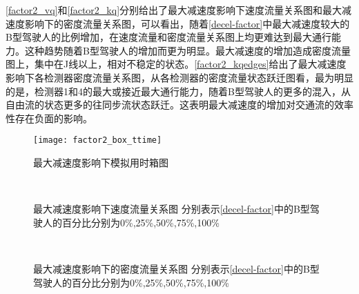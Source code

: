 \autoref{factor2_vq}和\autoref{factor2_kq}分别给出了最大减速度影响下速度流量关系图和最大减速度影响下的密度流量关系图，可以看出，随着\autoref{decel-factor}中最大减速度较大的B型驾驶人的比例增加，在速度流量和密度流量关系图上均更难达到最大通行能力。这种趋势随着B型驾驶人的增加而更为明显。最大减速度的增加造成密度流量图上，集中在J线以上，相对不稳定的状态。\autoref{factor2_kqedges}给出了最大减速度影响下各检测器密度流量关系图，从各检测器的密度流量状态跃迁图看，最为明显的是，检测器1和4的最大或接近最大通行能力，随着B型驾驶人的更多的混入，从自由流的状态更多的往同步流状态跃迁。这表明最大减速度的增加对交通流的效率性存在负面的影响。

\begin{figure}[htb]
\begin{center}
\texttt{[image: factor2\_box\_ttime]}
\caption{最大减速度影响下模拟用时箱图}
\label{factor2_box_ttime}
\end{center}
\end{figure}

\begin{figure}[htb]%
\centering
{}%
\\%
%
\caption[A set of four sub-floats.]{最大减速度影响下速度流量关系图
分别表示\autoref{decel-factor}中的B型驾驶人的百分比分别为0\%,25\%,50\%,75\%,100\%}%
\label{factor2_vq}%
\end{figure}



\begin{figure}[htb]%
\centering
{}%
\\%
%
\caption[A set of four sub-floats.]{最大减速度影响下的密度流量关系图
分别表示\autoref{decel-factor}中的B型驾驶人的百分比分别为0\%,25\%,50\%,75\%,100\%}%
\label{factor2_kq}%
\end{figure}




